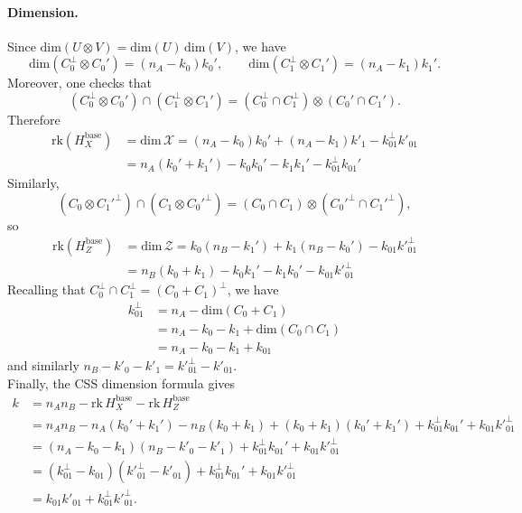 \documentclass[a4paper,onecolumn,11pt]{quantumarticle}
\def\dim{\mbox{dim}}
\def\rk{\mbox{rk}}
\begin{document}
\paragraph{Dimension.}
Since $\dim(U\otimes V)=\dim(U)\, \dim(V)$, we have
\[
\dim(C_0^\perp\otimes C_0')=(n_A-k_0)k_0',
\qquad
\dim(C_1^\perp\otimes C_1')=(n_A-k_1)k_1'.
\]
Moreover, one checks that
\[
(C_0^\perp\otimes C_0')\cap(C_1^\perp\otimes C_1')
=(C_0^\perp\cap C_1^\perp)\otimes(C_0'\cap C_1').
\]
Therefore
\begin{align*}
\rk(H_X^{\mathrm{base}})&=\dim \, \mathcal X
=(n_A-k_0)k_0' + (n_A-k_1)k'_1 - k_{01}^\perp k'_{01}\\
&=  n_A (k_0' + k_1') - k_0 k_0' - k_1 k_1' - k_{01}^\perp k_{01}'
\end{align*}
Similarly,
\[
(C_0\otimes C_1'^\perp)\cap(C_1\otimes C_0'^\perp)
=(C_0\cap C_1)\otimes(C_0'^\perp\cap C_1'^\perp),
\]
so
\begin{align*}
\rk(H_Z^{\mathrm{base}})&=\dim \, \mathcal Z
=k_0(n_B-k_1') + k_1(n_B-k_0') - k_{01} k'^\perp_{01}\\
&= n_B (k_0 + k_1) - k_0 k_1' - k_1 k_0' - k_{01} k'^\perp_{01}
\end{align*}
Recalling that $C_0^\perp \cap C_1^\perp = (C_0 + C_1)^\perp$, we have
\begin{align*}
k^\perp_{01} &= n_A - \mathrm{dim} (C_0+C_1) \\
 &= n_A - k_0 - k_1 + \mathrm{dim}(C_0 \cap C_1) \\
 &= n_A - k_0 - k_1 + k_{01}
 \end{align*}
 and similarly $n_B - k'_0 - k'_1 = k'^\perp_{01} - k'_{01}$.\\
Finally, the CSS dimension formula gives
\begin{align*}
k&= n_An_B -  \mathrm{rk} \, H^{\text{base}}_X - \mathrm{rk} \, H^{\text{base}}_Z\\
&= n_An_B- n_A (k_0'+k_1') - n_B (k_0+k_1) + (k_0+k_1)(k_0'+k_1') + k_{01}^\perp k_{01}'+k_{01} k'^\perp_{01}\\
&= (n_A -k_0-k_1)(n_B- k'_0-k'_1) + k_{01}^\perp k_{01}'+k_{01} k'^\perp_{01}\\
&= (k^\perp_{01} - k_{01}) (k'^{\perp}_{01} - k'_{01}) + k_{01}^\perp k_{01}'+k_{01} k'^\perp_{01}\\
&= k_{01} k'_{01} + k^\perp_{01} k'^\perp_{01}.
\end{align*}
\end{document}

